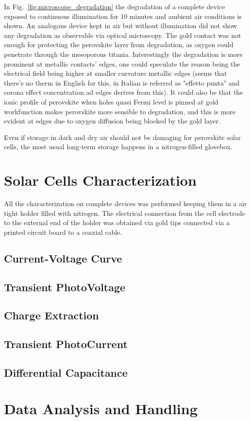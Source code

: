 		In Fig.~\ref{fig:microscope_degradation} the degradation of a complete device exposed to continuous illumination for 10 minutes and ambient air conditions is shown. An analogous device kept in air but without illumination did not show any degradation as observable via optical microscopy. The gold contact was not enough for protecting the perovskite layer from degradation, as oxygen could penetrate through the mesoporous titania. Interestingly the degradation is more prominent at metallic contacts' edges, one could speculate the reason being the electrical field being higher at smaller curvature metallic edges (seems that there's no therm in English for this, in Italian is referred as "effetto punta" and corona effect concentration ad edges derives from this). It could also be that the ionic profile of perovskite when holes quasi Fermi level is pinned at gold workfunction makes perovskite more sensible to degradation, and this is more evident at edges due to oxygen diffusion being blocked by the gold layer.

		Even if storage in dark and dry air should not be damaging for perovskite solar cells, the most usual long-term storage happens in a nitrogen-filled glovebox.

\section{Solar Cells Characterization}

	All the characterization on complete devices was performed keeping them in a air tight holder filled with nitrogen. The electrical connection from the cell electrode to the external end of the holder was obtained via gold tips connected via a printed circuit board to a coaxial cable.

	\subsection{Current-Voltage Curve}

		


	\subsection{Transient PhotoVoltage}
	
	\subsection{Charge Extraction}
	
	\subsection{Transient PhotoCurrent}
	
	\subsection{Differential Capacitance}
	
\section{Data Analysis and Handling}



